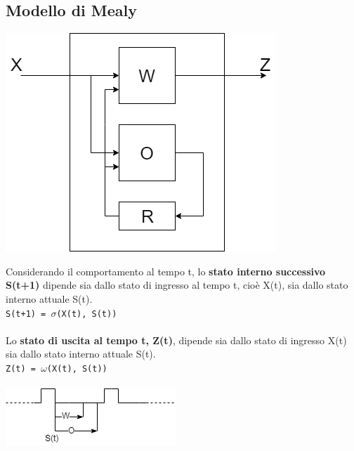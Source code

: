 \documentclass[10pt]{report}
\begin{document}
\subsection{Modello di Mealy}
\begin{multicols}{2}
\includegraphics[scale=0.5]{mealy.png}
\columnbreak

Considerando il comportamento al tempo t, lo \textbf{stato interno successivo S(t+1)} dipende sia dallo stato di ingresso al tempo t, cioè X(t), sia dallo stato interno attuale S(t).\\
\texttt{S(t+1) = $\sigma$(X(t), S(t))}\\\\

Lo \textbf{stato di uscita al tempo t, Z(t)}, dipende sia dallo stato di ingresso X(t) sia dallo stato interno attuale S(t).\\
\texttt{Z(t) = $\omega$(X(t), S(t))}\\\\
\includegraphics[scale=0.8]{clockmemo.png}
\end{multicols}
\end{document}
